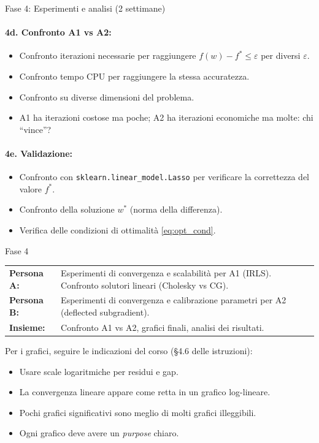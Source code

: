 \documentclass[a4paper,11pt]{article}
\begin{document}
\begin{phasebox}{Fase 4: Esperimenti e analisi (2 settimane)}
\paragraph{4d. Confronto A1 vs A2:}
\begin{itemize}[nosep]
  \item Confronto iterazioni necessarie per raggiungere $f(w) - f^* \leq \varepsilon$ per diversi $\varepsilon$.
  \item Confronto tempo CPU per raggiungere la stessa accuratezza.
  \item Confronto su diverse dimensioni del problema.
  \item A1 ha iterazioni costose ma poche; A2 ha iterazioni economiche ma molte: chi ``vince''?
\end{itemize}

\paragraph{4e. Validazione:}
\begin{itemize}[nosep]
  \item Confronto con \texttt{sklearn.linear\_model.Lasso} per verificare la correttezza del valore $f^*$.
  \item Confronto della soluzione $w^*$ (norma della differenza).
  \item Verifica delle condizioni di ottimalità \eqref{eq:opt_cond}.
\end{itemize}

\begin{splitbox}{Fase 4}
\begin{tabularx}{\textwidth}{lX}
\textbf{Persona A:} & Esperimenti di convergenza e scalabilità per A1 (IRLS). Confronto solutori lineari (Cholesky vs CG). \\
\textbf{Persona B:} & Esperimenti di convergenza e calibrazione parametri per A2 (deflected subgradient). \\
\textbf{Insieme:} & Confronto A1 vs A2, grafici finali, analisi dei risultati.
\end{tabularx}
\end{splitbox}

\begin{tipbox}
Per i grafici, seguire le indicazioni del corso (\S 4.6 delle istruzioni):
\begin{itemize}[nosep]
  \item Usare scale logaritmiche per residui e gap.
  \item La convergenza lineare appare come retta in un grafico log-lineare.
  \item Pochi grafici significativi sono meglio di molti grafici illeggibili.
  \item Ogni grafico deve avere un \emph{purpose} chiaro.
\end{itemize}
\end{tipbox}
\end{phasebox}
\end{document}
